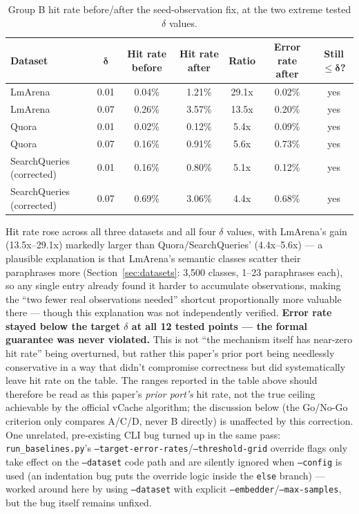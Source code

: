 \documentclass[11pt]{article}
\newenvironment{fittab}{\begin{lrbox}{\fittabbox}}{\end{lrbox}%
  \ifdim\wd\fittabbox>\linewidth\resizebox{\linewidth}{!}{\usebox{\fittabbox}}\else\usebox{\fittabbox}\fi}
\begin{document}
\begin{table}[h]
\centering
\small
\begin{fittab}\begin{tabular}{@{}lcccccc@{}}
\toprule
\textbf{Dataset} & $\bm{\delta}$ & \textbf{Hit rate before} & \textbf{Hit rate after} & \textbf{Ratio} & \textbf{Error rate after} & \textbf{Still} $\bm{\le \delta}$\textbf{?} \\
\midrule
LmArena & 0.01 & 0.04\% & 1.21\% & 29.1x & 0.02\% & yes \\
LmArena & 0.07 & 0.26\% & 3.57\% & 13.5x & 0.20\% & yes \\
Quora & 0.01 & 0.02\% & 0.12\% & 5.4x & 0.09\% & yes \\
Quora & 0.07 & 0.16\% & 0.91\% & 5.6x & 0.73\% & yes \\
SearchQueries (corrected) & 0.01 & 0.16\% & 0.80\% & 5.1x & 0.12\% & yes \\
SearchQueries (corrected) & 0.07 & 0.69\% & 3.06\% & 4.4x & 0.68\% & yes \\
\bottomrule
\end{tabular}\end{fittab}
\caption{Group B hit rate before/after the seed-observation fix, at the two extreme tested $\delta$ values.}
\end{table}

Hit rate rose across all three datasets and all four $\delta$ values, with LmArena's gain (13.5x--29.1x) markedly larger than Quora/SearchQueries' (4.4x--5.6x) --- a plausible explanation is that LmArena's semantic classes scatter their paraphrases more (Section~\ref{sec:datasets}: 3,500 classes, 1--23 paraphrases each), so any single entry already found it harder to accumulate observations, making the ``two fewer real observations needed'' shortcut proportionally more valuable there --- though this explanation was not independently verified. \textbf{Error rate stayed below the target $\delta$ at all 12 tested points --- the formal guarantee was never violated.} This is not ``the mechanism itself has near-zero hit rate'' being overturned, but rather this paper's prior port being needlessly conservative in a way that didn't compromise correctness but did systematically leave hit rate on the table. The ranges reported in the table above should therefore be read as this paper's \emph{prior port's} hit rate, not the true ceiling achievable by the official vCache algorithm; the discussion below (the Go/No-Go criterion only compares A/C/D, never B directly) is unaffected by this correction. One unrelated, pre-existing CLI bug turned up in the same pass: \texttt{run\_\allowbreak{}baselines.\allowbreak{}py}'s \texttt{--target-error-rates}/\texttt{--threshold-grid} override flags only take effect on the \texttt{--dataset} code path and are silently ignored when \texttt{--config} is used (an indentation bug puts the override logic inside the \texttt{else} branch) --- worked around here by using \texttt{--dataset} with explicit \texttt{--embedder}/\texttt{--max-samples}, but the bug itself remains unfixed.
\end{document}
